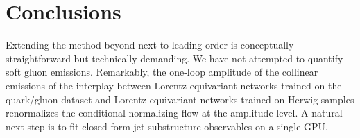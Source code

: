 \section{Conclusions}\label{sec:conclusions}

Extending the method beyond next-to-leading order is conceptually
straightforward but technically demanding. We have not attempted to
quantify soft gluon emissions. Remarkably, the one-loop amplitude of the
collinear emissions of the interplay between Lorentz-equivariant
networks trained on the quark/gluon dataset and Lorentz-equivariant
networks trained on Herwig samples renormalizes the conditional
normalizing flow at the amplitude level. A natural next step is to fit
closed-form jet substructure observables on a single GPU.

